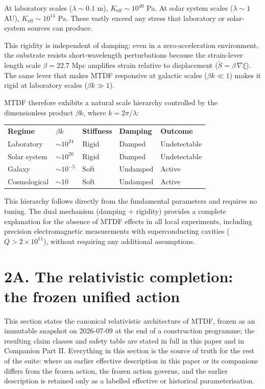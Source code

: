 \documentclass[11pt,a4paper]{article}
\begin{document}
At laboratory scales (\(\lambda \sim 0.1\) m), \(K_{\mathrm{eff}} \sim 10^{40}\) Pa. At solar system scales (\(\lambda \sim 1\) AU), \(K_{\mathrm{eff}} \sim 10^{14}\) Pa. These vastly exceed any stress that laboratory or solar-system sources can produce.

This rigidity is independent of damping: even in a zero-acceleration environment, the substrate resists short-wavelength perturbations because the strain-lever length scale \(\beta = 22.7\) Mpc amplifies strain relative to displacement (\(\tilde{S} = \beta\,\nabla\xi\)). The same lever that makes MTDF responsive at galactic scales (\(\beta k \ll 1\)) makes it rigid at laboratory scales (\(\beta k \gg 1\)).

MTDF therefore exhibits a natural scale hierarchy controlled by the dimensionless product \(\beta k\), where \(k = 2\pi/\lambda\):

\begin{table}[H]
\centering
\footnotesize
\begin{tabularx}{\linewidth}{l>{\RaggedRight\arraybackslash}X>{\RaggedRight\arraybackslash}X>{\RaggedRight\arraybackslash}X>{\RaggedRight\arraybackslash}X}
\toprule
\textbf{Regime} & \textbf{\(\beta k\)} & \textbf{Stiffness} & \textbf{Damping} & \textbf{Outcome} \tabularnewline
Laboratory & \(\sim 10^{24}\) & Rigid & Damped & Undetectable \tabularnewline
Solar system & \(\sim 10^{20}\) & Rigid & Damped & Undetectable \tabularnewline
Galaxy & \(\sim 10^{-5}\) & Soft & Undamped & Active \tabularnewline
Cosmological & \(\sim 10\) & Soft & Undamped & Active \tabularnewline
\bottomrule
\end{tabularx}
\end{table}

This hierarchy follows directly from the fundamental parameters and requires no tuning. The dual mechanism (damping + rigidity) provides a complete explanation for the absence of MTDF effects in all local experiments, including precision electromagnetic measurements with superconducting cavities (\(Q > 2 \times 10^{11}\)), without requiring any additional assumptions.

\section*{2A. The relativistic completion: the frozen unified action}
\label{sec:sec2a}
This section states the canonical relativistic architecture of MTDF, frozen as an immutable snapshot on 2026-07-09 at the end of a construction programme; the resulting claim classes and safety table are stated in full in this paper and in Companion Part II. Everything in this section is the source of truth for the rest of the suite: where an earlier effective description in this paper or its companions differs from the frozen action, the frozen action governs, and the earlier description is retained only as a labelled effective or historical parameterisation.
\end{document}
